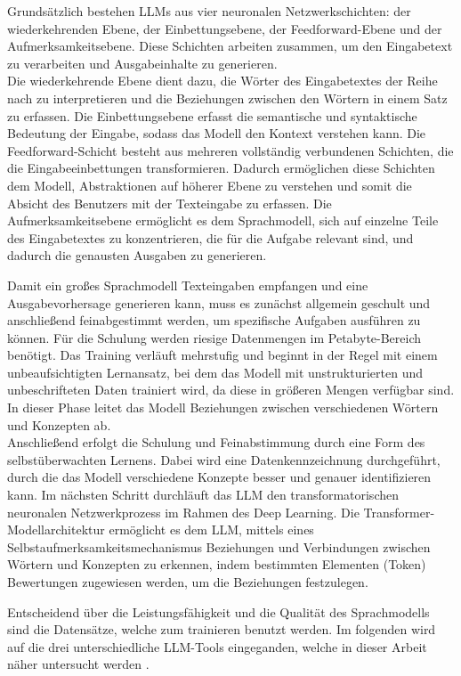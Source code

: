 Grundsätzlich bestehen LLMs aus vier neuronalen Netzwerkschichten: der wiederkehrenden Ebene, der Einbettungsebene, 
der Feedforward-Ebene und der Aufmerksamkeitsebene. Diese Schichten arbeiten zusammen, um den Eingabetext zu verarbeiten 
und Ausgabeinhalte zu generieren.\\
Die wiederkehrende Ebene dient dazu, die Wörter des Eingabetextes der Reihe nach zu interpretieren und die Beziehungen 
zwischen den Wörtern in einem Satz zu erfassen. Die Einbettungsebene erfasst die semantische und syntaktische Bedeutung 
der Eingabe, sodass das Modell den Kontext verstehen kann. Die Feedforward-Schicht besteht aus mehreren vollständig 
verbundenen Schichten, die die Eingabeeinbettungen transformieren. Dadurch ermöglichen diese Schichten dem Modell, 
Abstraktionen auf höherer Ebene zu verstehen und somit die Absicht des Benutzers mit der Texteingabe zu erfassen. Die 
Aufmerksamkeitsebene ermöglicht es dem Sprachmodell, sich auf einzelne Teile des Eingabetextes zu konzentrieren, die für 
die Aufgabe relevant sind, und dadurch die genausten Ausgaben zu generieren.

Damit ein großes Sprachmodell Texteingaben empfangen und eine Ausgabevorhersage generieren kann, muss es zunächst 
allgemein geschult und anschließend feinabgestimmt werden, um spezifische Aufgaben ausführen zu können. Für die 
Schulung werden riesige Datenmengen im Petabyte-Bereich benötigt. Das Training verläuft mehrstufig und beginnt in 
der Regel mit einem unbeaufsichtigten Lernansatz, bei dem das Modell mit unstrukturierten und unbeschrifteten Daten 
trainiert wird, da diese in größeren Mengen verfügbar sind. In dieser Phase leitet das Modell Beziehungen zwischen 
verschiedenen Wörtern und Konzepten ab.\\
Anschließend erfolgt die Schulung und Feinabstimmung durch eine Form des selbstüberwachten Lernens. Dabei wird eine 
Datenkennzeichnung durchgeführt, durch die das Modell verschiedene Konzepte besser und genauer identifizieren kann. 
Im nächsten Schritt durchläuft das LLM den transformatorischen neuronalen Netzwerkprozess im Rahmen des Deep Learning. 
Die Transformer-Modellarchitektur ermöglicht es dem LLM, mittels eines Selbstaufmerksamkeitsmechanismus Beziehungen 
und Verbindungen zwischen Wörtern und Konzepten zu erkennen, indem bestimmten Elementen (Token) Bewertungen zugewiesen 
werden, um die Beziehungen festzulegen.

Entscheidend über die Leistungsfähigkeit und die Qualität des Sprachmodells sind die Datensätze, welche zum trainieren
benutzt werden. Im folgenden wird auf die drei unterschiedliche LLM-Tools eingeganden, welche in dieser Arbeit näher 
untersucht werden \cite{GrundlagenLLM}. 

